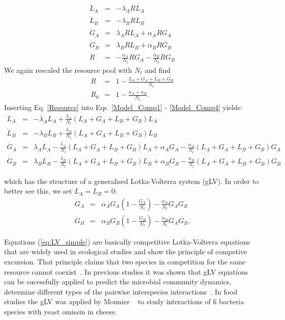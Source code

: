\documentclass[10pt,A4paper]{article}
\begin{document}
\begin{eqnarray}
\label{Model_Comp1}
\dot{L}_A &=& - \lambda_A R L_A\\
\dot{L}_B &=& - \lambda_B R L_B \\
\dot{G}_A &=& \lambda_A R L_A +\alpha_A R G_A\\
\label{Model_Comp4}
\dot{G}_B &=& \lambda_B R L_B +\alpha_B R G_B\\
\dot{R} &=&-\frac{\alpha_A}{N_t} R G_A-\frac{\alpha_B}{N_t} R G_B
\end{eqnarray}
We again rescaled the resource pool with $N_t$ and find
\begin{eqnarray}
\label{Resource}
R &=&1-\frac{L_A+G_A+L_B+G_B}{N_t}\\
R_0&=&1-\frac{n_A+n_B}{N_t}. 
\end{eqnarray}
Inserting Eq. \ref{Resource} into Eqs. \ref{Model_Comp1} - \ref{Model_Comp4} yields:
\begin{eqnarray*}
\dot{L}_A &=& - \lambda_A  L_A + \frac{\lambda_A}{N_t}\left(L_A+G_A+L_B+G_B\right )L_A\\
\dot{L}_B &=& - \lambda_B L_B + \frac{\lambda_B}{N_t}\left(L_A+G_A+L_B+G_B\right )L_B \\
\dot{G}_A &=&  \lambda_A  L_A - \frac{\lambda_A}{N_t}\left(L_A+G_A+L_B+G_B\right )L_A +\alpha_A G_A - \frac{\alpha_A}{N_t}\left(L_A+G_A+L_B+G_B\right )G_A\\
\dot{G}_B &=& \lambda_B L_B - \frac{\lambda_B}{N_t}\left(L_A+G_A+L_B+G_B\right )L_B  +\alpha_B G_B -\frac{\alpha_B}{N_t}\left(L_A+G_A+L_B+G_B\right )G_B
\end{eqnarray*}

which has the structure of a generalised Lotka-Volterra system (gLV). 
In order to better see this, we set $L_A=L_B=0$: 
\begin{eqnarray}
\label{Comp_Model}
\dot{G}_A &=& \alpha_A G_A\left(1 - \frac{G_A}{N_t}\right ) - \frac{\alpha_A}{N_t}G_AG_B\\
\dot{G}_B &=& \alpha_B G_B\left(1-\frac{G_B}{N_t}\right ) -\frac{\alpha_B}{N_t}G_AG_B. 
\label{eq:LV_simple}
\end{eqnarray} 

Equations (\ref{eq:LV_simple}) are basically competitive Lotka-Volterra equations that are widely used in ecological studies and show the principle of competive excursion.
That principle claims that two species in competition for the same resource cannot coexist~\cite{wangersky_lotka-volterra_1978}. 
In previous studies it was shown that gLV equations can be sucessfully applied to predict the microbial community dynamics, determine different types of the pairwise interspecies interactions~\cite{dedrick_when_2023, stein_ecological_2013, venturelli_deciphering_2018, hoffmann_power_2007}.
In food studies the gLV was applied by Mounier \etal~\cite{mounier_microbial_2008} to study interactions of 6 bacteria species  with yeast omissin in cheese.
\end{document}
